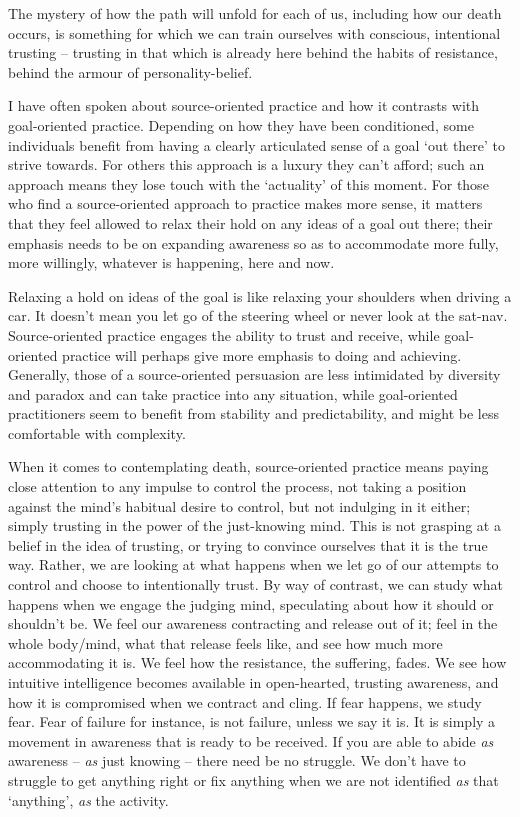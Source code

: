 The mystery of how the path will unfold for each of us, including how
our death occurs, is something for which we can train ourselves with
conscious, intentional trusting – trusting in that which is already here
behind the habits of resistance, behind the armour of
personality-belief.

I have often spoken about source-oriented practice and how it contrasts
with goal-oriented practice. Depending on how they have been
conditioned, some individuals benefit from having a clearly articulated
sense of a goal ‘out there’ to strive towards. For others this approach
is a luxury they can’t afford; such an approach means they lose touch
with the ‘actuality’ of this moment. For those who find a
source-oriented approach to practice makes more sense, it matters that
they feel allowed to relax their hold on any ideas of a goal out there;
their emphasis needs to be on expanding awareness so as to accommodate
more fully, more willingly, whatever is happening, here and now.

Relaxing a hold on ideas of the goal is like relaxing your shoulders
when driving a car. It doesn’t mean you let go of the steering wheel or
never look at the sat-nav. Source-oriented practice engages the ability
to trust and receive, while goal-oriented practice will perhaps give
more emphasis to doing and achieving. Generally, those of a
source-oriented persuasion are less intimidated by diversity and paradox
and can take practice into any situation, while goal-oriented
practitioners seem to benefit from stability and predictability, and
might be less comfortable with complexity.

When it comes to contemplating death, source-oriented practice means
paying close attention to any impulse to control the process, not taking
a position against the mind’s habitual desire to control, but not
indulging in it either; simply trusting in the power of the just-knowing
mind. This is not grasping at a belief in the idea of trusting, or
trying to convince ourselves that it is the true way. Rather, we are
looking at what happens when we let go of our attempts to control and
choose to intentionally trust. By way of contrast, we can study what
happens when we engage the judging mind, speculating about how it should
or shouldn’t be. We feel our awareness contracting and release out of
it; feel in the whole body/mind, what that release feels like, and see
how much more accommodating it is. We feel how the resistance, the
suffering, fades. We see how intuitive intelligence becomes available in
open-hearted, trusting awareness, and how it is compromised when we
contract and cling. If fear happens, we study fear. Fear of failure for
instance, is not failure, unless we say it is. It is simply a movement
in awareness that is ready to be received. If you are able to abide \emph{as}
awareness – \emph{as} just knowing – there need be no struggle. We don’t have
to struggle to get anything right or fix anything when we are not
identified \emph{as} that ‘anything’, \emph{as} the activity.

